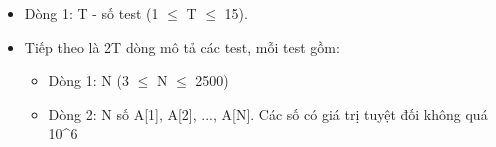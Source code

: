 \begin{itemize}
	\item Dòng 1: T - số test (1  $\le$  T  $\le$  15).
	\item Tiếp theo là 2T dòng mô tả các test, mỗi test gồm:
\begin{itemize}
	\item Dòng 1: N (3  $\le$  N  $\le$  2500)
	\item Dòng 2: N số A[1], A[2], ..., A[N]. Các số có giá trị tuyệt đối không quá 10^6
\end{itemize}
\end{itemize}

\